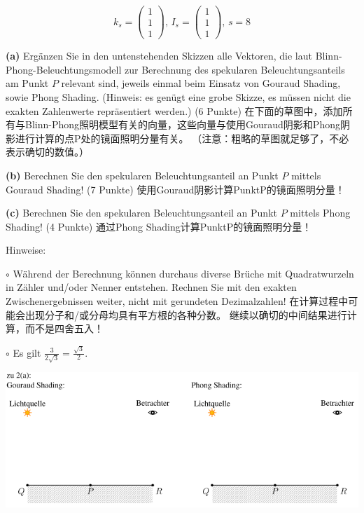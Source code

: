\documentclass[fleqn]{article}
\begin{document}
$$k_s=\begin{pmatrix}
    1\\1\\1
\end{pmatrix},\,I_s=\begin{pmatrix}
    1\\1\\1
\end{pmatrix},\,s=8$$

\indent\textbf{(a)} Ergänzen Sie in den untenstehenden Skizzen alle Vektoren, 
die laut Blinn-Phong-Beleuchtungsmodell zur Berechnung des spekularen 
Beleuchtungsanteils am Punkt $P$ relevant sind, jeweils einmal beim Einsatz von Gouraud Shading, sowie Phong Shading. (Hinweis: es genügt eine grobe Skizze, es müssen nicht die exakten Zahlenwerte repräsentiert werden.) (6 Punkte)
在下面的草图中，添加所有与Blinn-Phong照明模型有关的向量，这些向量与使用Gouraud阴影和Phong阴影进行计算的点P处的镜面照明分量有关。 （注意：粗略的草图就足够了，不必表示确切的数值。）

\indent\textbf{(b)} Berechnen Sie den spekularen Beleuchtungsanteil an Punkt $P$ mittels Gouraud Shading! (7 Punkte)
使用Gouraud阴影计算PunktP的镜面照明分量！

\indent\textbf{(c)} Berechnen Sie den spekularen Beleuchtungsanteil an Punkt $P$ mittels Phong Shading! (4 Punkte)
通过Phong Shading计算PunktP的镜面照明分量！

Hinweise:

$\circ$ Während der Berechnung können durchaus diverse Brüche mit Quadratwurzeln in Zähler und/oder Nenner entstehen. Rechnen Sie mit den exakten Zwischenergebnissen weiter, nicht mit gerundeten Dezimalzahlen!
在计算过程中可能会出现分子和/或分母均具有平方根的各种分数。 继续以确切的中间结果进行计算，而不是四舍五入！

$\circ$ Es gilt $\frac{3}{2\sqrt{3}}=\frac{\sqrt{3}}{2}$.

\begin{center}
    \includegraphics[scale=0.6]{23.png}
\end{center}
\end{document}

